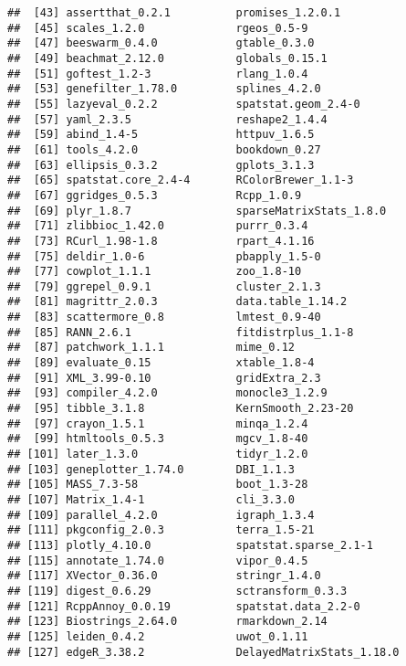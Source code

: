 \documentclass[
  openany]{book}
\begin{document}
\begin{verbatim}
##  [43] assertthat_0.2.1          promises_1.2.0.1         
##  [45] scales_1.2.0              rgeos_0.5-9              
##  [47] beeswarm_0.4.0            gtable_0.3.0             
##  [49] beachmat_2.12.0           globals_0.15.1           
##  [51] goftest_1.2-3             rlang_1.0.4              
##  [53] genefilter_1.78.0         splines_4.2.0            
##  [55] lazyeval_0.2.2            spatstat.geom_2.4-0      
##  [57] yaml_2.3.5                reshape2_1.4.4           
##  [59] abind_1.4-5               httpuv_1.6.5             
##  [61] tools_4.2.0               bookdown_0.27            
##  [63] ellipsis_0.3.2            gplots_3.1.3             
##  [65] spatstat.core_2.4-4       RColorBrewer_1.1-3       
##  [67] ggridges_0.5.3            Rcpp_1.0.9               
##  [69] plyr_1.8.7                sparseMatrixStats_1.8.0  
##  [71] zlibbioc_1.42.0           purrr_0.3.4              
##  [73] RCurl_1.98-1.8            rpart_4.1.16             
##  [75] deldir_1.0-6              pbapply_1.5-0            
##  [77] cowplot_1.1.1             zoo_1.8-10               
##  [79] ggrepel_0.9.1             cluster_2.1.3            
##  [81] magrittr_2.0.3            data.table_1.14.2        
##  [83] scattermore_0.8           lmtest_0.9-40            
##  [85] RANN_2.6.1                fitdistrplus_1.1-8       
##  [87] patchwork_1.1.1           mime_0.12                
##  [89] evaluate_0.15             xtable_1.8-4             
##  [91] XML_3.99-0.10             gridExtra_2.3            
##  [93] compiler_4.2.0            monocle3_1.2.9           
##  [95] tibble_3.1.8              KernSmooth_2.23-20       
##  [97] crayon_1.5.1              minqa_1.2.4              
##  [99] htmltools_0.5.3           mgcv_1.8-40              
## [101] later_1.3.0               tidyr_1.2.0              
## [103] geneplotter_1.74.0        DBI_1.1.3                
## [105] MASS_7.3-58               boot_1.3-28              
## [107] Matrix_1.4-1              cli_3.3.0                
## [109] parallel_4.2.0            igraph_1.3.4             
## [111] pkgconfig_2.0.3           terra_1.5-21             
## [113] plotly_4.10.0             spatstat.sparse_2.1-1    
## [115] annotate_1.74.0           vipor_0.4.5              
## [117] XVector_0.36.0            stringr_1.4.0            
## [119] digest_0.6.29             sctransform_0.3.3        
## [121] RcppAnnoy_0.0.19          spatstat.data_2.2-0      
## [123] Biostrings_2.64.0         rmarkdown_2.14           
## [125] leiden_0.4.2              uwot_0.1.11              
## [127] edgeR_3.38.2              DelayedMatrixStats_1.18.0

\end{verbatim}
\end{document}
